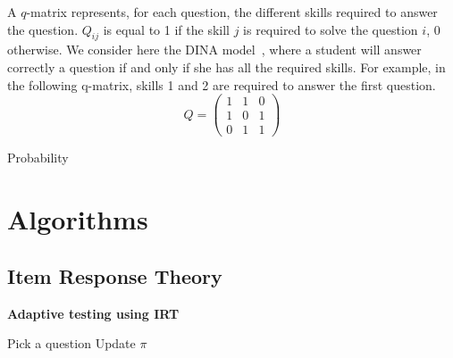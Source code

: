 \documentclass{sig-alternate}
\begin{document}

A $q$-matrix \cite{Takaoka} represents, for each question, the different skills required to answer the question. $Q_{ij}$ is equal to 1 if the skill $j$ is required to solve the question $i$, 0 otherwise. We consider here the DINA model~\cite{Desmarais2012}, where a student will answer correctly a question if and only if she has all the required skills. For example, in the following q-matrix, skills 1 and 2 are required to answer the first question. %
\[ Q = \left(\begin{array}{lll}
1 & 1 & 0\\
1 & 0 & 1\\
0 & 1 & 1
\end{array}\right) \]


Probability ~\cite{Huebner2010}




\section{Algorithms}


\subsection{Item Response Theory}


\begin{algorithm}
\caption*{\textbf{Adaptive testing using IRT}}
\begin{algorithmic}
	\State Pick a question
	\State Update $\pi$
\EndWhile
\EndProcedure
\end{algorithmic}
\end{algorithm}
\end{document}

